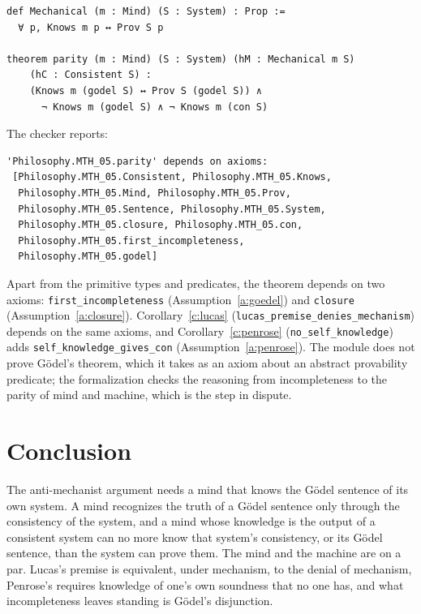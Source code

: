 \documentclass{situationist-preprint}
\begin{document}
\begin{lstlisting}
def Mechanical (m : Mind) (S : System) : Prop :=
  ∀ p, Knows m p ↔ Prov S p

theorem parity (m : Mind) (S : System) (hM : Mechanical m S)
    (hC : Consistent S) :
    (Knows m (godel S) ↔ Prov S (godel S)) ∧
      ¬ Knows m (godel S) ∧ ¬ Knows m (con S)
\end{lstlisting}

The checker reports:

\begin{lstlisting}
'Philosophy.MTH_05.parity' depends on axioms:
 [Philosophy.MTH_05.Consistent, Philosophy.MTH_05.Knows,
  Philosophy.MTH_05.Mind, Philosophy.MTH_05.Prov,
  Philosophy.MTH_05.Sentence, Philosophy.MTH_05.System,
  Philosophy.MTH_05.closure, Philosophy.MTH_05.con,
  Philosophy.MTH_05.first_incompleteness,
  Philosophy.MTH_05.godel]
\end{lstlisting}

Apart from the primitive types and predicates, the theorem depends on two axioms: \texttt{first\_incompleteness} (Assumption~\ref{a:goedel}) and \texttt{closure} (Assumption~\ref{a:closure}). Corollary~\ref{c:lucas} (\texttt{lucas\_premise\_denies\_mechanism}) depends on the same axioms, and Corollary~\ref{c:penrose} (\texttt{no\_self\_knowledge}) adds \texttt{self\_knowledge\_gives\_con} (Assumption~\ref{a:penrose}). The module does not prove G\"odel's theorem, which it takes as an axiom about an abstract provability predicate; the formalization checks the reasoning from incompleteness to the parity of mind and machine, which is the step in dispute.

\section{Conclusion}

The anti-mechanist argument needs a mind that knows the G\"odel sentence of its own system. A mind recognizes the truth of a G\"odel sentence only through the consistency of the system, and a mind whose knowledge is the output of a consistent system can no more know that system's consistency, or its G\"odel sentence, than the system can prove them. The mind and the machine are on a par. Lucas's premise is equivalent, under mechanism, to the denial of mechanism, Penrose's requires knowledge of one's own soundness that no one has, and what incompleteness leaves standing is G\"odel's disjunction.
\end{document}

